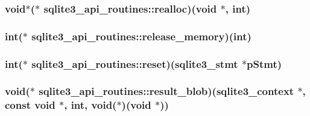 \hypertarget{structsqlite3__api__routines_a8acf7aa698ed5e3a6ecc09ba9ced9fec}{
\subsubsection[{realloc}]{\setlength{\rightskip}{0pt plus 5cm}void$\ast$($\ast$ sqlite3\-\_\-api\-\_\-routines\-::realloc)(void $\ast$, int)}}\label{structsqlite3__api__routines_a8acf7aa698ed5e3a6ecc09ba9ced9fec}
\hypertarget{structsqlite3__api__routines_a2dbb78dde331812425108d9eaeba7bf1}{
\subsubsection[{release\-\_\-memory}]{\setlength{\rightskip}{0pt plus 5cm}int($\ast$ sqlite3\-\_\-api\-\_\-routines\-::release\-\_\-memory)(int)}}\label{structsqlite3__api__routines_a2dbb78dde331812425108d9eaeba7bf1}
\hypertarget{structsqlite3__api__routines_a0ac99b0282f1843dbd0170c22be99957}{
\subsubsection[{reset}]{\setlength{\rightskip}{0pt plus 5cm}int($\ast$ sqlite3\-\_\-api\-\_\-routines\-::reset)({\bf sqlite3\-\_\-stmt} $\ast$p\-Stmt)}}\label{structsqlite3__api__routines_a0ac99b0282f1843dbd0170c22be99957}
\hypertarget{structsqlite3__api__routines_aab44964ab19917a95c1513890c5cdca2}{
\subsubsection[{result\-\_\-blob}]{\setlength{\rightskip}{0pt plus 5cm}void($\ast$ sqlite3\-\_\-api\-\_\-routines\-::result\-\_\-blob)({\bf sqlite3\-\_\-context} $\ast$, const void $\ast$, int, void($\ast$)(void $\ast$))}}\label{structsqlite3__api__routines_aab44964ab19917a95c1513890c5cdca2}
